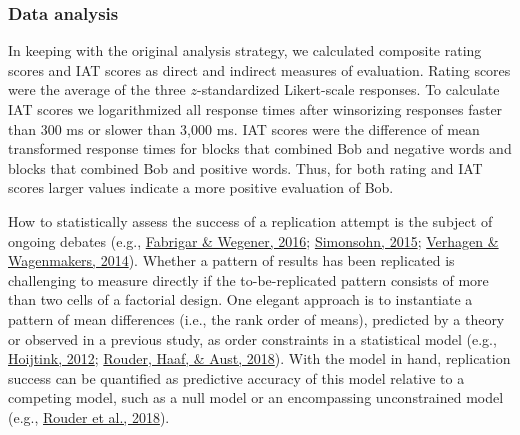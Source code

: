 \documentclass[
  man,floatsintext]{apa6}
\begin{document}
\hypertarget{data-analysis1}{%
\subsubsection{Data analysis}\label{data-analysis1}}

In keeping with the original analysis strategy, we calculated composite rating scores and IAT scores as direct and indirect measures of evaluation.
Rating scores were the average of the three \(z\)-standardized Likert-scale responses.
To calculate IAT scores we logarithmized all response times after winsorizing responses faster than 300 ms or slower than 3,000 ms.
IAT scores were the difference of mean transformed response times for blocks that combined Bob and negative words and blocks that combined Bob and positive words.
Thus, for both rating and IAT scores larger values indicate a more positive evaluation of Bob.

How to statistically assess the success of a replication attempt is the subject of ongoing debates (e.g., \protect\hyperlink{ref-fabrigar_conceptualizing_2016}{Fabrigar \& Wegener, 2016}; \protect\hyperlink{ref-simonsohn_small_2013}{Simonsohn, 2015}; \protect\hyperlink{ref-verhagen_bayesian_2014}{Verhagen \& Wagenmakers, 2014}).
Whether a pattern of results has been replicated is challenging to measure directly if the to-be-replicated pattern consists of more than two cells of a factorial design.
One elegant approach is to instantiate a pattern of mean differences (i.e., the rank order of means), predicted by a theory or observed in a previous study, as order constraints in a statistical model (e.g., \protect\hyperlink{ref-hoijtink_informative_2012}{Hoijtink, 2012}; \protect\hyperlink{ref-rouder_theories_2018}{Rouder, Haaf, \& Aust, 2018}).
With the model in hand, replication success can be quantified as predictive accuracy of this model relative to a competing model, such as a null model or an encompassing unconstrained model (e.g., \protect\hyperlink{ref-rouder_theories_2018}{Rouder et al., 2018}).
\end{document}
